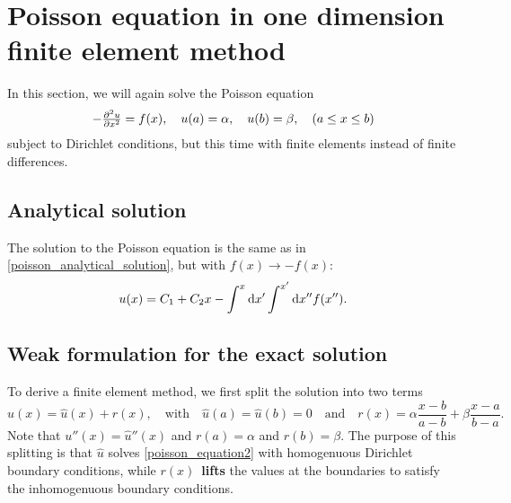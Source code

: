 \section{Poisson equation in one dimension finite element method}

\newcommand\basisexpand[2]{\sum_{i=0}^{M+1} #1_i \varphi_i(#2)}
\newcommand\integral[4]{\int_#3^#4 \dif #2 \, #1}

In this section, we will again solve the Poisson equation
\begin{equation}
	-\pd[2]{u}{x} = f(x), \quad u(a) = \alpha, \quad u(b) = \beta, \quad (a \leq x \leq b)
	\label{poisson_equation2}
\end{equation}
subject to Dirichlet conditions, but this time with finite elements instead of finite differences.

\subsection{Analytical solution}

The solution to the Poisson equation is the same as in \ref{poisson_analytical_solution}, but with $f(x) \rightarrow -f(x)$:
\begin{equation}
u(x) = C_1 + C_2 x - \int^x \dif x' \int^{x'} \dif x'' f(x'').
\label{poisson_analytical_solution2}
\end{equation}

\subsection{Weak formulation for the exact solution}

To derive a finite element method, we first split the solution into two terms
\begin{equation}
	u(x) = \hat{u}(x) + r(x), \quad \text{with} \quad \hat{u}(a) = \hat{u}(b) = 0 \quad \text{and} \quad r(x) = \alpha \frac{x-b}{a-b} + \beta \frac{x-a}{b-a}.
	\label{splitting_exact}
\end{equation}
Note that $u''(x) = \hat{u}''(x)$ and $r(a) = \alpha$ and $r(b) = \beta$.
The purpose of this splitting is that $\hat{u}$ solves \ref{poisson_equation2} with homogenuous Dirichlet boundary conditions, while $r(x)$ \textbf{lifts} the values at the boundaries to satisfy the inhomogenuous boundary conditions.

